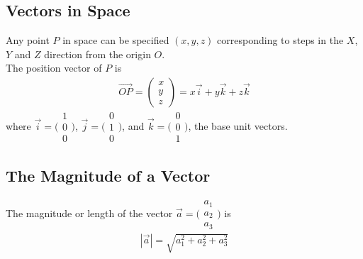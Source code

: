 \documentclass[10pt, a4paper, titlepage]{article}
\begin{document}
\begin{multicols*}{3}
	\subsection{Vectors in Space}
	Any point $P$ in space can be specified $(x,y,z)$ corresponding to steps in the $X$, $Y$ and $Z$ direction from the origin $O$.\\
	The position vector of $P$ is
	\begin{align}
		\overrightarrow{OP}=\begin{pmatrix}x\\ y \\z\end{pmatrix}=x\vec{i}+y\vec{k}+z\vec{k}
	\end{align}
	where $\vec{i}=\big(\begin{smallmatrix}1 \\0 \\0 \end{smallmatrix}\big)$, 
	$\vec{j}=\big(\begin{smallmatrix}0 \\1 \\0 \end{smallmatrix}\big)$, and 
	$\vec{k}=\big(\begin{smallmatrix}0 \\0 \\1 \end{smallmatrix}\big)$, the base unit vectors.

	\dotfill
	\subsection{The Magnitude of a Vector}
	The magnitude or length of the vector $\vec{a}=\big(\begin{smallmatrix}a_1 \\a_2 \\a_3 \end{smallmatrix}\big)$ is
	\begin{align}
		|\vec{a}|=\sqrt{a_1^2+a_2^2+a_3^2}
	\end{align}
	\dotfill

\end{multicols*}
\end{document}
